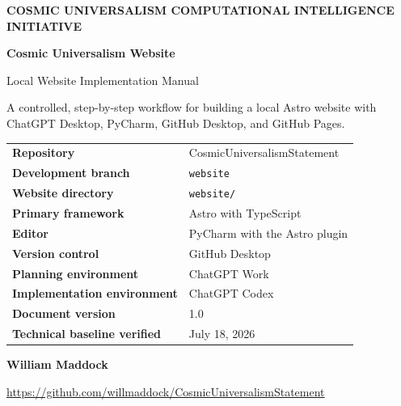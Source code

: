 \documentclass[11pt,letterpaper]{article}
\newcommand{\ProjectTitle}{Cosmic Universalism Website}
\newcommand{\DocumentTitle}{Local Website Implementation Manual}
\newcommand{\RepositoryName}{CosmicUniversalismStatement}
\newcommand{\RepositoryURL}{https://github.com/willmaddock/CosmicUniversalismStatement}
\newcommand{\WebsiteBranch}{website}
\newcommand{\WebsiteDirectory}{website/}
\newcommand{\DocumentVersion}{1.0}
\newcommand{\VerificationDate}{July 18, 2026}
\newcommand{\AuthorName}{William Maddock}
\begin{document}
\begin{titlepage}
\pagecolor{CUNavy}
\color{white}
\thispagestyle{empty}

\vspace*{0.8in}

{\small\bfseries\color{CUCyanLight}
COSMIC UNIVERSALISM COMPUTATIONAL INTELLIGENCE INITIATIVE}

\vspace{0.45in}

{\Huge\bfseries
\ProjectTitle}

\vspace{0.2in}

{\LARGE\color{CUGoldLight}
\DocumentTitle}

\vspace{0.4in}

{\large
A controlled, step-by-step workflow for building a local Astro website
with ChatGPT Desktop, PyCharm, GitHub Desktop, and GitHub Pages.}

\vfill

\begin{tcolorbox}[
    colback=CUNavyTwo,
    colframe=CUBlue,
    boxrule=0.8pt,
    arc=2mm,
    width=\textwidth
]
\color{white}
\begin{tabularx}{\textwidth}{>{\bfseries}L{1.65in}Y}
Repository & \RepositoryName \\
Development branch & \texttt{\WebsiteBranch} \\
Website directory & \texttt{\WebsiteDirectory} \\
Primary framework & Astro with TypeScript \\
Editor & PyCharm with the Astro plugin \\
Version control & GitHub Desktop \\
Planning environment & ChatGPT Work \\
Implementation environment & ChatGPT Codex \\
Document version & \DocumentVersion \\
Technical baseline verified & \VerificationDate \\
\end{tabularx}
\end{tcolorbox}

\vfill

{\large\bfseries \AuthorName}

\vspace{0.1in}

{\small
\href{\RepositoryURL}{\RepositoryURL}}

\vspace{0.5in}

\end{titlepage}
\end{document}
